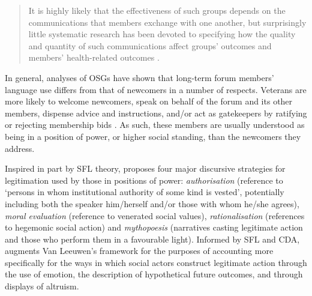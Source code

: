 \documentclass{article}
\renewcommand{\cite}{\parencite}
\begin{document}
\begin{quote}\small\singlespacing
It is highly likely that the effectiveness of such groups depends on the communications that members exchange with one another, but surprisingly little systematic research has been devoted to specifying how the quality and quantity of such communications affect groups' outcomes and members' health-related outcomes \parencite*[p.~1]{wang_stay_2012}.
\end{quote}

In general, analyses of OSGs have shown that long-term forum members' language use differs from that of newcomers in a number of respects. Veterans are more likely to welcome newcomers, speak on behalf of the forum and its other members, dispense advice and instructions, and\slash or act as gatekeepers by ratifying or rejecting membership bids \cite{paulus_`please_2015,pederson_supporting_2010,weber_missed_2011}. As such, these members are usually understood as being in a position of power, or higher social standing, than the newcomers they address.

Inspired in part by SFL theory, \textcite[p.~92]{van_leeuwen_legitimation_2007} proposes four major discursive strategies for legitimation used by those in positions of power: \emph{authorisation} (reference to `persons in whom institutional authority of some kind is vested', potentially including both the speaker him\slash herself and\slash or those with whom he\slash she agrees), \emph{moral evaluation} (reference to venerated social values), \emph{rationalisation} (references to hegemonic social action) and \emph{mythopoesis} (narratives casting legitimate action and those who perform them in a favourable light). Informed by SFL and CDA, \textcite{reyes_strategies_2011} augments Van Leeuwen's framework for the purposes of accounting more specifically for the ways in which social actors construct legitimate action through the use of emotion, the description of hypothetical future outcomes, and through displays of altruism. %

\end{document}
